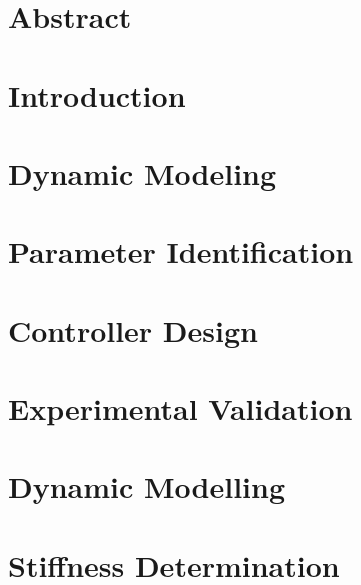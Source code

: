 \documentclass[12pt,twoside]{report}
\begin{document}

\thispagestyle{empty}



\chapter*{Abstract}

\cleardoublepage

\tableofcontents

\cleardoublepage

\cleardoublepage







\chapter{Introduction}

\cleardoublepage

\chapter{Dynamic Modeling}

\cleardoublepage

\chapter{Parameter Identification}

\cleardoublepage


\chapter{Controller Design}

\cleardoublepage


\chapter{Experimental Validation}





%




\newpage


\cleardoublepage


\appendix
\chapter{Dynamic Modelling}



\appendix
\chapter{Stiffness Determination}

\end{document}
